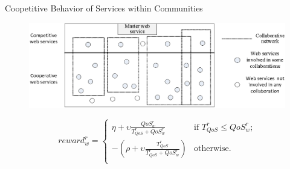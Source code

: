 \documentclass{beamer}
\begin{document}
\begin{frame}{Coopetitive Behavior of Services within Communities}
    \begin{figure}[h]
        \centering
        \includegraphics[scale=0.6]{figures/architecture++.eps}
        \label{architectureFigure}
    \end{figure}
    
    \footnotesize

    \begin{equation*} \label{repr}
        reward_w^r = \begin{cases}
        \eta + \upsilon \frac{QoS_w^r}{T_{QoS}^r+QoS_w^r}   & \text{if $T_{QoS}^r\leq QoS_w^r$;}\\
        -(\rho +  \upsilon \frac{T_{QoS}^r}{T_{QoS}^r+QoS_w^r} ) & \text{otherwise.}\\
        \end{cases}
    \end{equation*}



%


\end{frame}
\end{document}
